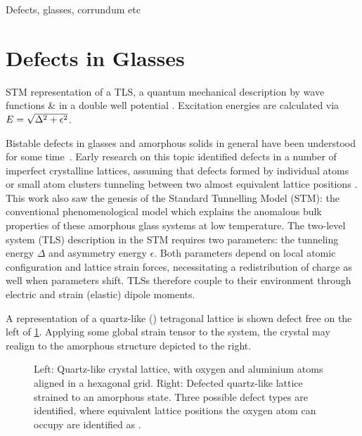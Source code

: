 Defects, glasses, corrundum etc







\section{Defects in Glasses}
\begin{marginfigure}
\resizebox{\marginparwidth}{!}{}
\caption[STM picture of a TLS]{STM representation of a TLS, a quantum mechanical description by wave functions  \&  in a double well potential . Excitation energies are calculated via $\cramped{E = \sqrt{\Delta^2+\epsilon^2}}$. }
\end{marginfigure}
Bistable defects in glasses and amorphous solids in general have been understood for some time~\cite{Zachariasen1932,Anderson1972}.
Early research on this topic identified defects in a number of imperfect crystalline lattices, assuming that defects formed by individual atoms or small atom clusters tunneling between two almost equivalent lattice positions \cite{Anderson1972,Phillips1972}.
This work also saw the genesis of the Standard Tunnelling Model (STM): the conventional phenomenological  model which explains the anomalous bulk properties of these amorphous glass systems at low temperature.
The two-level system (TLS) description in the STM requires two parameters: the tunneling energy $\Delta$ and asymmetry energy $\epsilon$.
Both parameters depend on local atomic configuration and lattice strain forces, necessitating a redistribution of charge as well when parameters shift.
TLSs therefore couple to their environment through electric and strain (elastic) dipole moments.

A representation of a quartz-like () tetragonal lattice is shown defect free on the left of \cref{fig:sio2}.
Applying some global strain tensor to the system, the crystal may realign to the amorphous structure depicted to the right.
\begin{figure}[htp]
\widefiguremargins
\begin{adjustwidth}{\leftwidth}{\rightwidth}
\resizebox{\widefigure}{!}{}
\caption[Quartz-like Crystal Lattice, Pure and Defected]{\label{fig:sio2}Left: Quartz-like crystal lattice, with oxygen \resizebox{!}{0.6em}{} and aluminium \resizebox{!}{0.6em}{} atoms aligned in a hexagonal grid. Right: Defected quartz-like lattice strained to an amorphous state. Three possible defect types are identified, where equivalent lattice positions the oxygen atom can occupy are identified as \resizebox{!}{0.6em}{}.}
\end{adjustwidth}
\end{figure}

